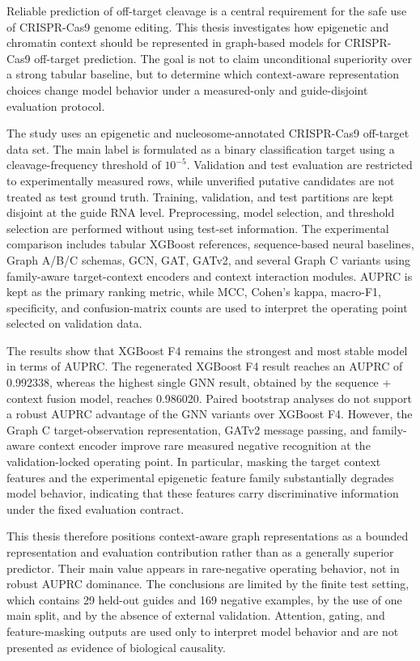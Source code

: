 \documentclass{btu-thesis}
\begin{document}
\begin{BTUabstractEN}
Reliable prediction of off-target cleavage is a central requirement for the safe use of CRISPR-Cas9 genome editing. This thesis investigates how epigenetic and chromatin context should be represented in graph-based models for CRISPR-Cas9 off-target prediction. The goal is not to claim unconditional superiority over a strong tabular baseline, but to determine which context-aware representation choices change model behavior under a measured-only and guide-disjoint evaluation protocol.

The study uses an epigenetic and nucleosome-annotated CRISPR-Cas9 off-target data set. The main label is formulated as a binary classification target using a cleavage-frequency threshold of \(10^{-5}\). Validation and test evaluation are restricted to experimentally measured rows, while unverified putative candidates are not treated as test ground truth. Training, validation, and test partitions are kept disjoint at the guide RNA level. Preprocessing, model selection, and threshold selection are performed without using test-set information. The experimental comparison includes tabular XGBoost references, sequence-based neural baselines, Graph A/B/C schemas, GCN, GAT, GATv2, and several Graph C variants using family-aware target-context encoders and context interaction modules. AUPRC is kept as the primary ranking metric, while MCC, Cohen's kappa, macro-F1, specificity, and confusion-matrix counts are used to interpret the operating point selected on validation data.

The results show that XGBoost F4 remains the strongest and most stable model in terms of AUPRC. The regenerated XGBoost F4 result reaches an AUPRC of 0.992338, whereas the highest single GNN result, obtained by the sequence + context fusion model, reaches 0.986020. Paired bootstrap analyses do not support a robust AUPRC advantage of the GNN variants over XGBoost F4. However, the Graph C target-observation representation, GATv2 message passing, and family-aware context encoder improve rare measured negative recognition at the validation-locked operating point. In particular, masking the target context features and the experimental epigenetic feature family substantially degrades model behavior, indicating that these features carry discriminative information under the fixed evaluation contract.

This thesis therefore positions context-aware graph representations as a bounded representation and evaluation contribution rather than as a generally superior predictor. Their main value appears in rare-negative operating behavior, not in robust AUPRC dominance. The conclusions are limited by the finite test setting, which contains 29 held-out guides and 169 negative examples, by the use of one main split, and by the absence of external validation. Attention, gating, and feature-masking outputs are used only to interpret model behavior and are not presented as evidence of biological causality.
\end{BTUabstractEN}
\end{document}
